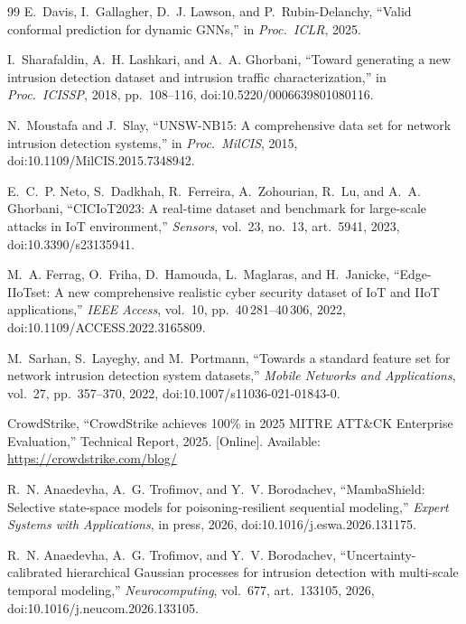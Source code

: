 \documentclass{ieeeaccess}
\begin{document}
\begin{thebibliography}{99}
E.~Davis, I.~Gallagher, D.~J. Lawson, and P.~Rubin-Delanchy,
``Valid conformal prediction for dynamic GNNs,''
in \emph{Proc.\ ICLR}, 2025.

I.~Sharafaldin, A.~H. Lashkari, and A.~A. Ghorbani,
``Toward generating a new intrusion detection dataset and intrusion traffic
characterization,''
in \emph{Proc.\ ICISSP}, 2018, pp.~108--116,
doi:10.5220/0006639801080116.

N.~Moustafa and J.~Slay,
``UNSW-NB15: A comprehensive data set for network intrusion detection
systems,''
in \emph{Proc.\ MilCIS}, 2015, doi:10.1109/MilCIS.2015.7348942.

E.~C.~P. Neto, S.~Dadkhah, R.~Ferreira, A.~Zohourian, R.~Lu, and
A.~A. Ghorbani,
``CICIoT2023: A real-time dataset and benchmark for large-scale attacks in
IoT environment,''
\emph{Sensors}, vol.~23, no.~13, art.~5941, 2023, doi:10.3390/s23135941.

M.~A. Ferrag, O.~Friha, D.~Hamouda, L.~Maglaras, and H.~Janicke,
``Edge-IIoTset: A new comprehensive realistic cyber security dataset of IoT
and IIoT applications,''
\emph{IEEE Access}, vol.~10, pp.~40\,281--40\,306, 2022,
doi:10.1109/ACCESS.2022.3165809.

M.~Sarhan, S.~Layeghy, and M.~Portmann,
``Towards a standard feature set for network intrusion detection system
datasets,''
\emph{Mobile Networks and Applications}, vol.~27, pp.~357--370, 2022,
doi:10.1007/s11036-021-01843-0.

CrowdStrike,
``CrowdStrike achieves 100\% in 2025 MITRE ATT\&CK Enterprise Evaluation,''
Technical Report, 2025. [Online]. Available:
\url{https://crowdstrike.com/blog/}


R.~N. Anaedevha, A.~G. Trofimov, and Y.~V. Borodachev,
``MambaShield: Selective state-space models for poisoning-resilient
sequential modeling,''
\emph{Expert Systems with Applications}, in press, 2026,
doi:10.1016/j.eswa.2026.131175.

R.~N. Anaedevha, A.~G. Trofimov, and Y.~V. Borodachev,
``Uncertainty-calibrated hierarchical Gaussian processes for intrusion
detection with multi-scale temporal modeling,''
\emph{Neurocomputing}, vol.~677, art.~133105, 2026,
doi:10.1016/j.neucom.2026.133105.


\end{thebibliography}
\end{document}
